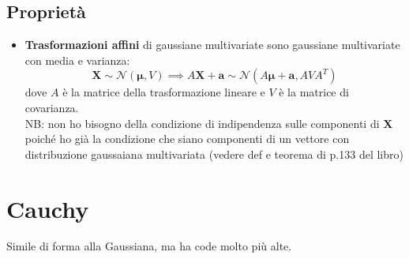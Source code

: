 \documentclass[a4paper,10pt]{article}
\theoremstyle{remark}
\theoremstyle{definition}
\begin{document}
\subsection*{Proprietà}
\begin{itemize}
    \item \textbf{Trasformazioni affini} di gaussiane multivariate sono gaussiane multivariate con media e varianza:
    $$ \pmb{X}\sim \mathcal{N}(\pmb{\mu},V) \implies  A\pmb{X}+\pmb{a} \sim  \mathcal{N}(A\pmb{\mu}+\pmb{a}, AVA^T) $$
    dove $A$ è la matrice della trasformazione lineare e $V$ è la matrice di covarianza. \\
    NB: non ho bisogno della condizione di indipendenza sulle componenti di $\pmb{X}$ poiché ho già la condizione che siano componenti di un vettore con distribuzione gaussaiana multivariata (vedere def e teorema di p.133 del libro)
\end{itemize}

\section{Cauchy}
Simile di forma alla Gaussiana, ma ha code molto più alte.
\end{document}
